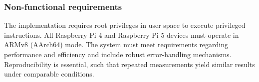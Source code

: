     \subsubsection{Non-functional requirements} \label{subsubsec:non-functional-requirements}
      The implementation requires root privileges in user space to execute privileged instructions.
      All Raspberry Pi 4 and Raspberry Pi 5 devices must operate in ARMv8 (AArch64) mode. The 
      system must meet requirements regarding performance and efficiency and include robust error-handling mechanisms. 
      Reproducibility is essential, such that repeated measurements yield similar results under comparable conditions.

    
    
